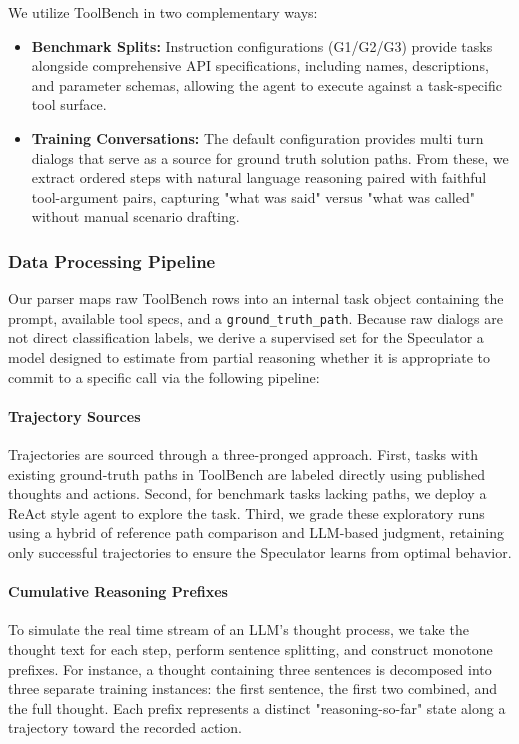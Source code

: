 \documentclass[letterpaper,twocolumn,10pt]{article}
\newenvironment{denseitemize}{
\begin{itemize}[topsep=2.5pt, partopsep=0pt, leftmargin=1.5em]
  \setlength{\itemsep}{2.5pt}
  \setlength{\parskip}{0pt}
  \setlength{\parsep}{0pt}
}{\end{itemize}}
\begin{document}
We utilize ToolBench in two complementary ways:
\begin{denseitemize}
    \item \textbf{Benchmark Splits:} Instruction configurations (G1/G2/G3) provide tasks alongside comprehensive API specifications, including names, descriptions, and parameter schemas, allowing the agent to execute against a task-specific tool surface.
    \item \textbf{Training Conversations:} The default configuration provides multi turn dialogs that serve as a source for ground truth solution paths. From these, we extract ordered steps with natural language reasoning paired with faithful tool-argument pairs, capturing "what was said" versus "what was called" without manual scenario drafting.
\end{denseitemize}

\subsubsection{Data Processing Pipeline}
Our parser maps raw ToolBench rows into an internal task object containing the prompt, available tool specs, and a \texttt{ground\_truth\_path}. Because raw dialogs are not direct classification labels, we derive a supervised set for the Speculator a model designed to estimate from partial reasoning whether it is appropriate to commit to a specific call via the following pipeline:

\paragraph{Trajectory Sources}
Trajectories are sourced through a three-pronged approach. First, tasks with existing ground-truth paths in ToolBench are labeled directly using published thoughts and actions. Second, for benchmark tasks lacking paths, we deploy a ReAct style agent \cite{yao2022react} to explore the task. Third, we grade these exploratory runs using a hybrid of reference path comparison and LLM-based judgment, retaining only successful trajectories to ensure the Speculator learns from optimal behavior.

\paragraph{Cumulative Reasoning Prefixes}
To simulate the real time stream of an LLM's thought process, we take the thought text for each step, perform sentence splitting, and construct monotone prefixes. For instance, a thought containing three sentences is decomposed into three separate training instances: the first sentence, the first two combined, and the full thought. Each prefix represents a distinct "reasoning-so-far" state along a trajectory toward the recorded action.
\end{document}
